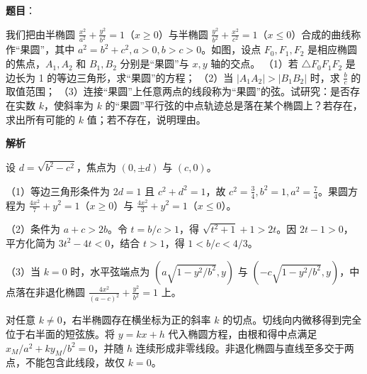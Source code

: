 \begin{answer}

\textbf{题目}：

我们把由半椭圆 $\frac{x^2}{a^2}+\frac{y^2}{b^2}=1$（$x\ge0$）与半椭圆 $\frac{y^2}{b^2}+\frac{x^2}{c^2}=1$（$x\le0$）合成的曲线称作“果圆”，其中 $a^2=b^2+c^2,a>0,b>c>0$。如图，设点 $F_0,F_1,F_2$ 是相应椭圆的焦点，$A_1,A_2$ 和 $B_1,B_2$ 分别是“果圆”与 $x,y$ 轴的交点。
（1）若 $\triangle F_0F_1F_2$ 是边长为 1 的等边三角形，求“果圆”的方程；
（2）当 $|A_1A_2|>|B_1B_2|$ 时，求 $\frac bc$ 的取值范围；
（3）连接“果圆”上任意两点的线段称为“果圆”的弦。试研究：是否存在实数 $k$，使斜率为 $k$ 的“果圆”平行弦的中点轨迹总是落在某个椭圆上？若存在，求出所有可能的 $k$ 值；若不存在，说明理由。
\nopagebreak[4]
\begin{center}\end{center}
\nopagebreak[4]
\textbf{解析}

设 $d=\sqrt{b^2-c^2}$，焦点为 $(0,\pm d)$ 与 $(c,0)$。

（1）等边三角形条件为 $2d=1$ 且 $c^2+d^2=1$，故 $c^2=\frac34,b^2=1,a^2=\frac74$。果圆方程为 $\frac{4x^2}{7}+y^2=1$（$x\ge0$）与 $\frac{4x^2}{3}+y^2=1$（$x\le0$）。

（2）条件为 $a+c>2b$。令 $t=b/c>1$，得 $\sqrt{t^2+1}+1>2t$。因 $2t-1>0$，平方化简为 $3t^2-4t<0$，结合 $t>1$，得 $1<b/c<4/3$。

（3）当 $k=0$ 时，水平弦端点为 $(a\sqrt{1-y^2/b^2},y)$ 与 $(-c\sqrt{1-y^2/b^2},y)$，中点落在非退化椭圆 $\frac{4x^2}{(a-c)^2}+\frac{y^2}{b^2}=1$ 上。

对任意 $k\ne0$，右半椭圆存在横坐标为正的斜率 $k$ 的切点。切线向内微移得到完全位于右半面的短弦族。将 $y=kx+h$ 代入椭圆方程，由根和得中点满足 $x_M/a^2+ky_M/b^2=0$，并随 $h$ 连续形成非零线段。非退化椭圆与直线至多交于两点，不能包含此线段，故仅 $k=0$。


\end{answer}